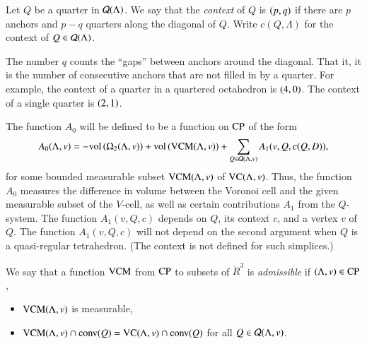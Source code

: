 \begin{definition} \label{def:context}
Let $Q$ be a quarter in ${\mathcal Q}(\Lambda)$.  We say that the {\it
context\/} of $Q$ is $\relax(p,q)$ if there are $p$ anchors and $p-q$
quarters along the diagonal of $Q$. Write $c(Q,\Lambda)$ for the context
of $Q\in{\mathcal Q}(\Lambda)$.
\end{definition}

\begin{remark}
The number $q$ counts the ``gaps'' between anchors around the
diagonal. That it, it is the number of consecutive anchors that
are not filled in by a quarter.  For example, the context of a
quarter in a quartered octahedron is $\relax(4,0)$. The context of a
single quarter is $\relax(2,1)$.
\end{remark}

The function $A_0$ will be defined to be a function on ${\operatorname{CP}}$
of the form
  \begin{equation}
  A_0(\Lambda,v) = -{\operatorname{vol}}\,(\Omega_2(\Lambda,v)) + {\operatorname{vol}}\,({\operatorname{VCM}}(\Lambda,v)) +
   \sum_{Q\in{\mathcal Q}(\Lambda,v)} A_1(v,Q,c(Q,D)),
   \label{eqn:A1}
   \end{equation}
for some bounded measurable subset ${\operatorname{VCM}}(\Lambda,v)$ of ${\operatorname{VC}}(\Lambda,v)$.
Thus, the function $A_0$ measures the difference in volume between
the Voronoi cell and the given measurable subset of the $V$-cell,
as well as certain contributions $A_1$ from the $Q$-system. The
function $A_1(v,Q,c)$ depends on $Q$, its context $c$, and a
vertex $v$ of $Q$.  The function $A_1(v,Q,c)$ will not depend on
the second argument when $Q$ is a quasi-regular tetrahedron.  (The
context is not defined for such simplices.)

\begin{definition}[admissible]\label{def:vcm-admiss}  We say that a function ${\operatorname{VCM}}$ from
${\operatorname{CP}}$ to subsets of $\ring{R}^3$ is {\it admissible} if
$(\Lambda,v)\in{\operatorname{CP}}$,
    \begin{itemize}
        \item ${\operatorname{VCM}}(\Lambda,v)$ is measurable,
        \item ${\operatorname{VCM}}(\Lambda,v)\cap {\operatorname{conv}}(Q) = 
         {\operatorname{VC}}(\Lambda,v)\cap {\operatorname{conv}}(Q)$ for all
        $Q\in{\mathcal Q}(\Lambda,v)$.
    \end{itemize}
\end{definition}

